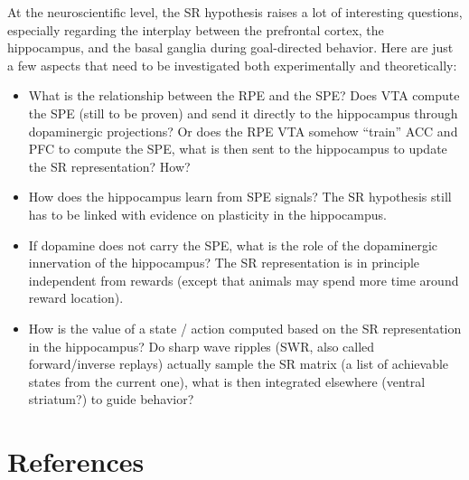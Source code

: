 \documentclass[
  11pt,
]{article}
\providecommand{\tightlist}{%
  \setlength{\itemsep}{0pt}\setlength{\parskip}{0pt}}
\begin{document}
At the neuroscientific level, the SR hypothesis raises a lot of
interesting questions, especially regarding the interplay between the
prefrontal cortex, the hippocampus, and the basal ganglia during
goal-directed behavior. Here are just a few aspects that need to be
investigated both experimentally and theoretically:

\begin{itemize}
\tightlist
\item
  What is the relationship between the RPE and the SPE? Does VTA compute
  the SPE (still to be proven) and send it directly to the hippocampus
  through dopaminergic projections? Or does the RPE VTA somehow
  ``train'' ACC and PFC to compute the SPE, what is then sent to the
  hippocampus to update the SR representation? How?
\item
  How does the hippocampus learn from SPE signals? The SR hypothesis
  still has to be linked with evidence on plasticity in the hippocampus.
\item
  If dopamine does not carry the SPE, what is the role of the
  dopaminergic innervation of the hippocampus? The SR representation is
  in principle independent from rewards (except that animals may spend
  more time around reward location).
\item
  How is the value of a state / action computed based on the SR
  representation in the hippocampus? Do sharp wave ripples (SWR, also
  called forward/inverse replays) actually sample the SR matrix (a list
  of achievable states from the current one), what is then integrated
  elsewhere (ventral striatum?) to guide behavior?
\end{itemize}

\hypertarget{references}{%
\section*{References}\label{references}}
\end{document}
